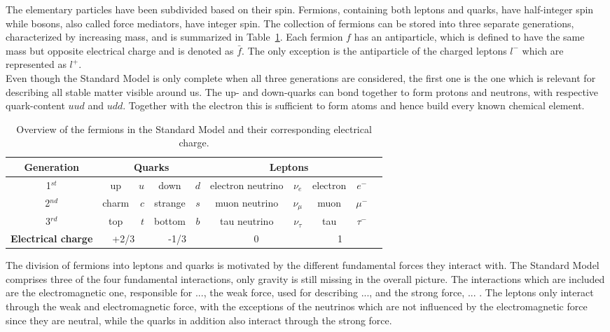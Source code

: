 The elementary particles have been subdivided based on their spin. Fermions, containing both leptons and quarks, have half-integer spin while bosons, also called force mediators, have integer spin. 
The collection of fermions can be stored into three separate generations, characterized by increasing mass, and is summarized in Table~\ref{table::ElemParticles}.  Each fermion $f$ has an antiparticle, which is defined to have the same mass but opposite electrical charge and is denoted as $\bar{f}$. The only exception is the antiparticle of the charged leptons $l^{-}$ which are represented as $l^{+}$.\\
Even though the Standard Model is only complete when all three generations are considered, the first one is the one which is relevant for describing all stable matter visible around us.
The up- and down-quarks can bond together to form protons and neutrons, with respective quark-content $uud$ and $udd$. Together with the electron this is sufficient to form atoms and hence build every known chemical element.
\setlength\extrarowheight{5pt}
\begin{table}[h!t]
 \centering
 \caption{Overview of the fermions in the Standard Model and their corresponding electrical charge.} \label{table::ElemParticles}
 \begin{tabular}{|c|cr|cc|cc|cc|c|}
  \hline
  \textbf{Generation} 		& \multicolumn{4}{c|}{\textbf{Quarks}} 				& \multicolumn{4}{c|}{\textbf{Leptons}} 				\\
  \hline
  1$^{st}$ 			& up 		& $u$ 		& down 		& $d$ 		& electron neutrino	& $\nu_{e}$ 	& electron	& $e^{-}$ 	\\
  \hline
  2$^{nd}$ 			& charm 	& $c$ 		& strange 	& $s$		& muon neutrino		& $\nu_{\mu}$ 	& muon		& $\mu^{-}$ 	\\
  \hline
  3$^{rd}$ 			& top		& $t$ 		& bottom 	& $b$ 		& tau neutrino 		& $\nu_{\tau}$ 	& tau		& $\tau^{-}$ 	\\
  \hline
  \hline
  \textbf{Electrical charge} 	& \multicolumn{2}{c|}{+2/3} 	& \multicolumn{2}{c|}{-1/3} 	& \multicolumn{2}{c|}{0} 		& \multicolumn{2}{c|}{1}	\\
  \hline
 \end{tabular}
\end{table}

The division of fermions into leptons and quarks is motivated by the different fundamental forces they interact with. The Standard Model comprises three of the four fundamental interactions, only gravity is still missing in the overall picture. The interactions which are included are the electromagnetic one, responsible for ..., the weak force, used for describing ..., and the strong force, ... . The leptons only interact through the weak and electromagnetic force, with the exceptions of the neutrinos which are not influenced by the electromagnetic force since they are neutral, while the quarks in addition also interact through the strong force. 

